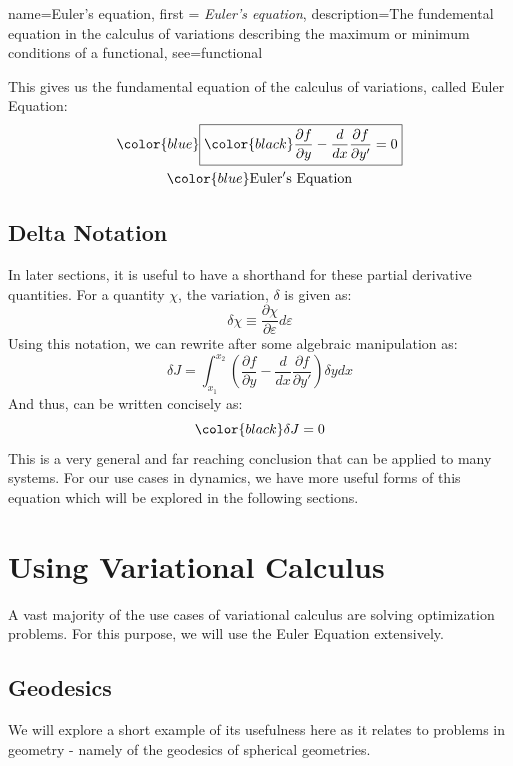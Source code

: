 {
    name=Euler's equation,
    first = {\textit{Euler's equation}},
    description={The fundemental equation in the calculus of variations describing the maximum or minimum conditions of a functional},
    see={functional}
}

This gives us the fundamental equation of the calculus of variations, called \gls{Euler Equation}:
\begin{gather}\label{eq: Euler's Diff eq}
\color{blue}\boxed{\color{black}\frac{\partial f}{\partial y}-\frac{d}{dx}\frac{\partial f}{\partial y'}=0}\\
\color{blue}\mathrm{Euler's \ Equation}
\end{gather}
\subsection{Delta Notation}
In later sections, it is useful to have a shorthand for these partial derivative quantities. For a quantity $\chi$, the variation, $\delta$ is given as:
$$\delta\chi\equiv\frac{\partial\chi}{\partial \varepsilon}d\varepsilon$$Using this notation, we can rewrite  after some algebraic manipulation as:
\begin{equation}
    \delta J= \int_{x_1}^{x_2}\left(\frac{\partial f}{\partial y}-\frac{d}{dx}\frac{\partial f}{\partial y'}\right)\delta y{dx}
\end{equation}
And thus,  can be written concisely as:
\begin{equation}
    {\color{black}\delta J=0}
\end{equation}
This is a very general and far reaching conclusion that can be applied to many systems. For our use cases in dynamics, we have more useful forms of this equation which will be explored in the following sections.

\section{Using Variational Calculus}
A vast majority of the use cases of variational calculus are solving optimization problems. For this purpose, we will use the \gls{Euler Equation} extensively. 

\subsection{Geodesics}
We will explore a short example of its usefulness here as it relates to problems in geometry - namely of the \glspl{geodesic} of spherical geometries.


